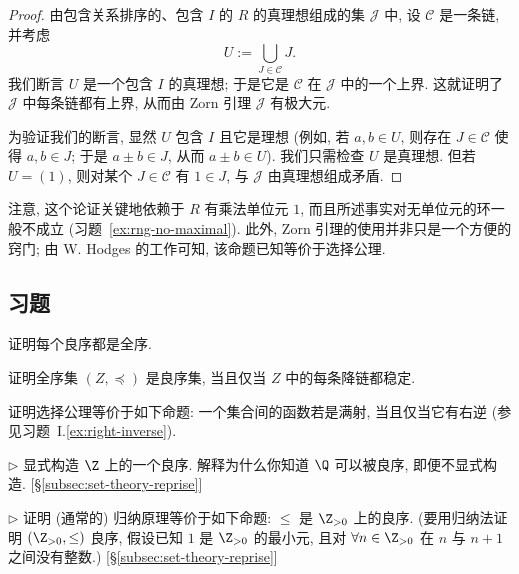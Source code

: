 \begin{proof}
由包含关系排序的、包含 $I$ 的 $R$ 的真理想组成的集 $\mathcal{J}$ 中, 设 $\mathcal{C}$ 是一条链, 并考虑
\[
U := \bigcup_{J\in\mathcal{C}} J.
\]
我们断言 $U$ 是一个包含 $I$ 的真理想; 于是它是 $\mathcal{C}$ 在 $\mathcal{J}$ 中的一个上界. 这就证明了 $\mathcal{J}$ 中每条链都有上界, 从而由 Zorn 引理 $\mathcal{J}$ 有极大元.

\noindent 为验证我们的断言, 显然 $U$ 包含 $I$ 且它是理想 (例如, 若 $a,b\in U$, 则存在 $J\in\mathcal{C}$ 使得 $a,b\in J$; 于是 $a\pm b\in J$, 从而 $a\pm b\in U$). 我们只需检查 $U$ 是真理想. 但若 $U=(1)$, 则对某个 $J\in\mathcal{C}$ 有 $1\in J$, 与 $\mathcal{J}$ 由真理想组成矛盾.
\end{proof}

\noindent 注意, 这个论证关键地依赖于 $R$ 有乘法单位元 $1$, 而且所述事实对无单位元的环一般不成立 (习题~\ref{ex:rng-no-maximal}). 此外, Zorn 引理的使用并非只是一个方便的窍门; 由 W. Hodges 的工作可知, 该命题已知等价于选择公理.

\subsection*{习题}
{}

\begin{prob}
\label{ex:wellordering-total}
证明每个良序都是全序.
\end{prob}

\begin{prob}
\label{ex:woset-dcc}
证明全序集 $(Z,\preceq)$ 是良序集, 当且仅当 $Z$ 中的每条降链都稳定.
\end{prob}

\begin{prob}
\label{ex:ac-right-inverse}
证明选择公理等价于如下命题: 一个集合间的函数若是满射, 当且仅当它有右逆 (参见习题~I.\ref{ex:right-inverse}).
\end{prob}

\begin{prob}
\label{ex:wellorder-z}
$\triangleright$ 显式构造 $\Z$ 上的一个良序. 解释为什么你知道 $\Q$ 可以被良序, 即便不显式构造. [§\ref{subsec:set-theory-reprise}]
\end{prob}

\begin{prob}
\label{ex:induction-wop}
$\triangleright$ 证明 (通常的) 归纳原理等价于如下命题: $\le$ 是 $\Z_{>0}$ 上的良序. (要用归纳法证明 $(\Z_{>0},\le)$ 良序, 假设已知 $1$ 是 $\Z_{>0}$ 的最小元, 且对 $\forall n\in\Z_{>0}$ 在 $n$ 与 $n+1$ 之间没有整数.) [§\ref{subsec:set-theory-reprise}]
\end{prob}


